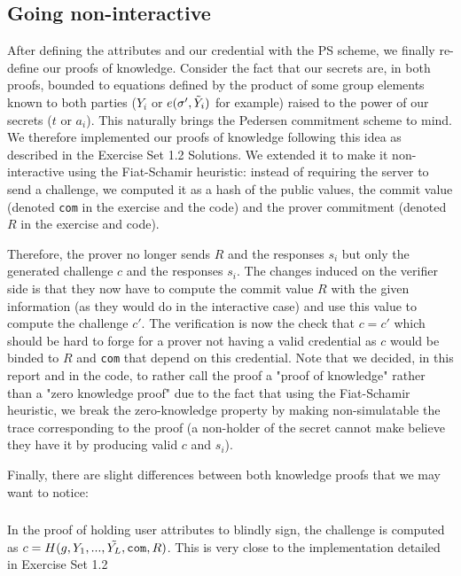 \documentclass[10pt,conference,compsocconf]{IEEEtran}
\begin{document}
\subsection{Going non-interactive}
After defining the attributes and our credential with the PS scheme, we finally re-define our proofs of knowledge. Consider the fact that our secrets are, in both proofs, bounded to equations defined by the product of some group elements known to both parties ($Y_i$ or $e(\sigma',\Tilde{Y}_i)$ for example) raised to the power of our secrets ($t$ or $a_i$). This naturally brings the Pedersen commitment scheme to mind. We therefore implemented our proofs of knowledge following this idea as described in the Exercise Set 1.2 Solutions\cite{exercise_set_1.2}. We extended it to make it non-interactive using the Fiat-Schamir heuristic: instead of requiring the server to send a challenge, we computed it as a hash of the public values, the commit value (denoted \texttt{com} in the exercise and the code) and the prover commitment (denoted $R$ in the exercise and code). 

Therefore, the prover no longer sends $R$ and the responses $s_i$ but only the generated challenge $c$ and the responses $s_i$. The changes induced on the verifier side is that they now have to compute the commit value $R$ with the given information (as they would do in the interactive case) and use this value to compute the challenge $c'$. The verification is now the check that $c=c'$ which should be hard to forge for a prover not having a valid credential as $c$ would be binded to $R$ and \texttt{com} that depend on this credential. Note that we decided, in this report and in the code, to rather call the proof a "proof of knowledge" rather than a "zero knowledge proof" due to the fact that using the Fiat-Schamir heuristic, we break the zero-knowledge property by making non-simulatable the trace corresponding to the proof (a non-holder of the secret cannot make believe they have it by producing valid $c$ and $s_i$).

Finally, there are slight differences between both knowledge proofs that we may want to notice:
\subsubsection{} In the proof of holding user attributes to blindly sign, the challenge is computed as $c=H(g,Y_1,...,\Tilde{Y_L},\texttt{com},R)$. This is very close to the implementation detailed in Exercise Set 1.2 \cite{exercise_set_1.2}
\end{document}
